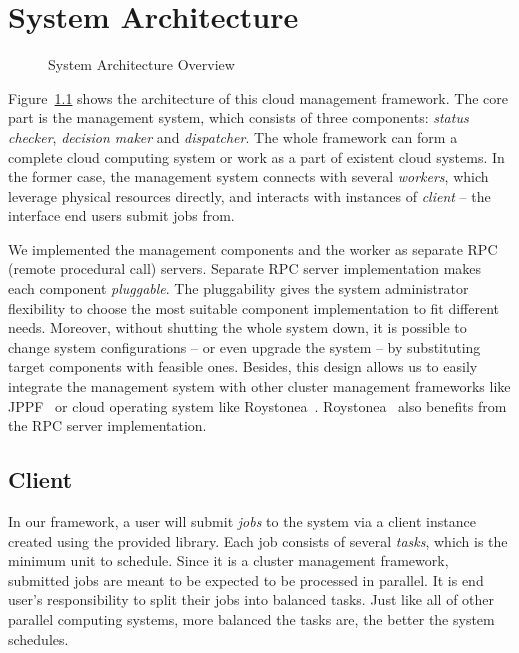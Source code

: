\chapter{System Architecture}

\begin{figure}
  \centering
  
  \caption{System Architecture Overview}
  \label{fig:archi-overview}
\end{figure}

Figure~\ref{fig:archi-overview} shows the architecture of this cloud
management framework.
The core part is the management system, which consists of three
components: \emph{status checker}, \emph{decision maker} and
\emph{dispatcher}.
The whole framework can form a complete cloud computing system or work
as a part of existent cloud systems.
In the former case, the management system connects with several
\emph{workers}, which leverage physical resources directly, and
interacts with instances of \emph{client} -- the interface end users
submit jobs from.

We implemented the management components and the worker as separate RPC
(remote procedural call) servers.
Separate RPC server implementation makes each component
\emph{pluggable}.
The pluggability gives the system administrator flexibility to choose
the most suitable component implementation to fit different needs.
Moreover, without shutting the whole system down, it is possible to
change system configurations -- or even upgrade the system -- by
substituting target components with feasible ones.
Besides, this design allows us to easily integrate the management system
with other cluster management frameworks like JPPF~\cite{cite:JPPF} or
cloud operating system like Roystonea~\cite{cite:roystonea}.
Roystonea~\cite{cite:roystonea} also benefits from the RPC server
implementation.

\section{Client}

In our framework, a user will submit \emph{jobs} to the system via a
client instance created using the provided library.
Each job consists of several \emph{tasks}, which is the minimum unit to
schedule.
Since it is a cluster management framework, submitted jobs are meant to
be expected to be processed in parallel. It is end user's responsibility
to split their jobs into balanced tasks.
Just like all of other parallel computing systems, more balanced the
tasks are, the better the system schedules.

